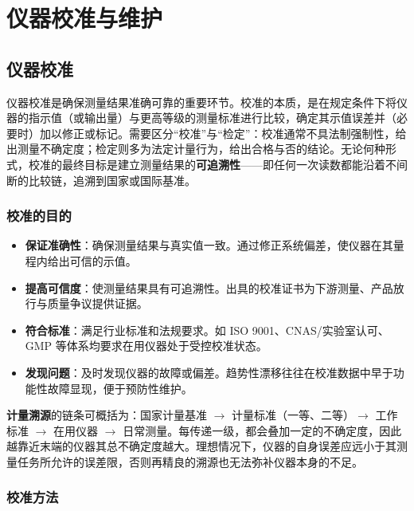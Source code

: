 
\chapter{仪器校准与维护}
\label{chap:calibration_maintenance}

\section{仪器校准}
\label{sec:instrument_calibration}

仪器校准是确保测量结果准确可靠的重要环节。校准的本质，是在规定条件下将仪器的指示值（或输出量）与更高等级的测量标准进行比较，确定其示值误差并（必要时）加以修正或标记。需要区分“校准”与“检定”：校准通常不具法制强制性，给出测量不确定度；检定则多为法定计量行为，给出合格与否的结论。无论何种形式，校准的最终目标是建立测量结果的\textbf{可追溯性}——即任何一次读数都能沿着不间断的比较链，追溯到国家或国际基准。

\subsection{校准的目的}

\begin{itemize}
    \item \textbf{保证准确性}：确保测量结果与真实值一致。通过修正系统偏差，使仪器在其量程内给出可信的示值。
    \item \textbf{提高可信度}：使测量结果具有可追溯性。出具的校准证书为下游测量、产品放行与质量争议提供证据。
    \item \textbf{符合标准}：满足行业标准和法规要求。如 ISO 9001、CNAS/实验室认可、GMP 等体系均要求在用仪器处于受控校准状态。
    \item \textbf{发现问题}：及时发现仪器的故障或偏差。趋势性漂移往往在校准数据中早于功能性故障显现，便于预防性维护。
\end{itemize}

\textbf{计量溯源}的链条可概括为：国家计量基准 $\rightarrow$ 计量标准（一等、二等）$\rightarrow$ 工作标准 $\rightarrow$ 在用仪器 $\rightarrow$ 日常测量。每传递一级，都会叠加一定的不确定度，因此越靠近末端的仪器其总不确定度越大。理想情况下，仪器的自身误差应远小于其测量任务所允许的误差限，否则再精良的溯源也无法弥补仪器本身的不足。

\subsection{校准方法}

